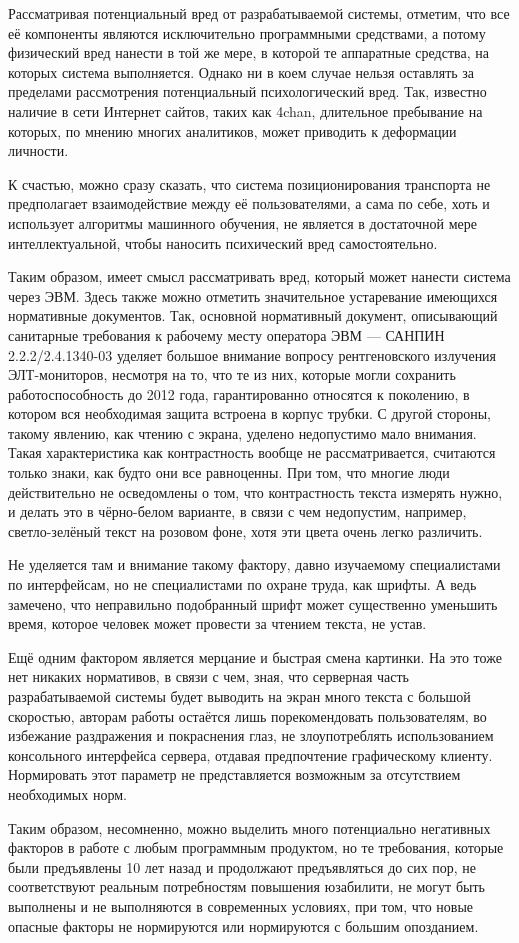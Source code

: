 Рассматривая потенциальный вред от разрабатываемой системы, отметим, что все её компоненты являются исключительно программными средствами, а потому физический вред нанести в той же мере, в которой те аппаратные средства, на которых система выполняется. Однако ни в коем случае нельзя оставлять за пределами рассмотрения потенциальный психологический вред. Так, известно наличие в сети Интернет сайтов, таких как 4chan, длительное пребывание на которых, по мнению многих аналитиков\cite{4chan}, может приводить к деформации личности.

К счастью, можно сразу сказать, что система позиционирования транспорта не предполагает взаимодействие между её пользователями, а сама по себе, хоть и использует алгоритмы машинного обучения, не является в достаточной мере интеллектуальной, чтобы наносить психический вред самостоятельно.

Таким образом, имеет смысл рассматривать вред, который может нанести система через ЭВМ. Здесь также можно отметить значительное устаревание имеющихся нормативные документов. Так, основной нормативный документ, описывающий санитарные требования к рабочему месту оператора ЭВМ --- САНПИН 2.2.2/2.4.1340-03\cite{sanpin} уделяет большое внимание вопросу рентгеновского излучения ЭЛТ-мониторов, несмотря на то, что те из них, которые могли сохранить работоспособность до 2012 года, гарантированно относятся к поколению, в котором вся необходимая защита встроена в корпус трубки. С другой стороны, такому явлению, как чтению с экрана, уделено недопустимо мало внимания. Такая характеристика как контрастность вообще не рассматривается, считаются только знаки, как будто они все равноценны. При том, что многие люди действительно не осведомлены о том, что контрастность текста измерять нужно, и делать это в чёрно-белом варианте, в связи с чем недопустим, например, светло-зелёный текст на розовом фоне, хотя эти цвета очень легко различить.

Не уделяется там и внимание такому фактору, давно изучаемому специалистами по интерфейсам, но не специалистами по охране труда, как шрифты. А ведь замечено, что неправильно подобранный шрифт может существенно уменьшить время, которое человек может провести за чтением текста, не устав.

Ещё одним фактором является мерцание и быстрая смена картинки. На это тоже нет никаких нормативов, в связи с чем, зная, что серверная часть разрабатываемой системы будет выводить на экран много текста с большой скоростью, авторам работы остаётся лишь порекомендовать пользователям, во избежание раздражения и покраснения глаз, не злоупотреблять использованием консольного интерфейса сервера, отдавая предпочтение графическому клиенту. Нормировать этот параметр не представляется возможным за отсутствием необходимых норм.

Таким образом, несомненно, можно выделить много потенциально негативных факторов в работе с любым программным продуктом, но те требования, которые были предъявлены 10 лет назад и продолжают предъявляться до сих пор, не соответствуют реальным потребностям повышения юзабилити, не могут быть выполнены и не выполняются в современных условиях, при том, что новые опасные факторы не нормируются или нормируются с большим опозданием.
